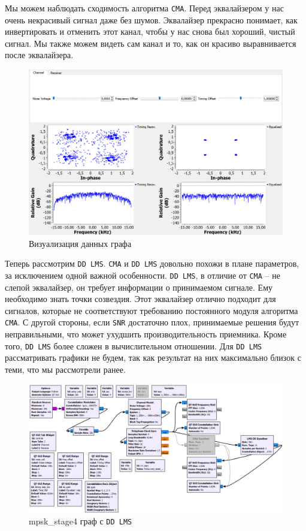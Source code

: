 \documentclass[a4paper,12pt]{report}
\begin{document}
Мы можем наблюдать сходимость алгоритма \texttt{CMA}. Перед эквалайзером у нас очень некрасивый сигнал даже без шумов. Эквалайзер прекрасно понимает, как инвертировать и отменить этот канал, чтобы у нас снова был хороший, чистый сигнал. Мы также можем видеть сам канал и то, как он красиво выравнивается после эквалайзера.

\begin{figure}[H]
        \centering
        \includegraphics[width=1.0\textwidth]{lab12_fig5_2.png}
        \caption{Визуализация данных графа}
        \label{fig:lab12_fig5_2}
\end{figure}

Теперь рассмотрим \texttt{DD LMS}. \texttt{CMA} и \texttt{DD LMS} довольно похожи в плане параметров, за исключением одной важной особенности. \texttt{DD LMS}, в отличие от \texttt{CMA} – не слепой эквалайзер, он требует информации о принимаемом сигнале. Ему необходимо знать точки созвездия. Этот эквалайзер отлично подходит для сигналов, которые не соответствуют требованию постоянного модуля алгоритма \texttt{CMA}. С другой стороны, если \texttt{SNR} достаточно плох, принимаемые решения будут неправильными, что может ухудшить производительность приемника. Кроме того, \texttt{DD LMS} более сложен в вычислительном отношении. Для \texttt{DD LMS} рассматривать графики не будем, так как результат на них максимально близок с теми, что мы рассмотрели ранее.

\begin{figure}[H]
        \centering
        \includegraphics[width=1.0\textwidth]{lab12_fig5_3.png}
        \caption{mpsk\_stage4 граф с \texttt{DD LMS}}
        \label{fig:lab12_fig5_3}
\end{figure}
\end{document}
